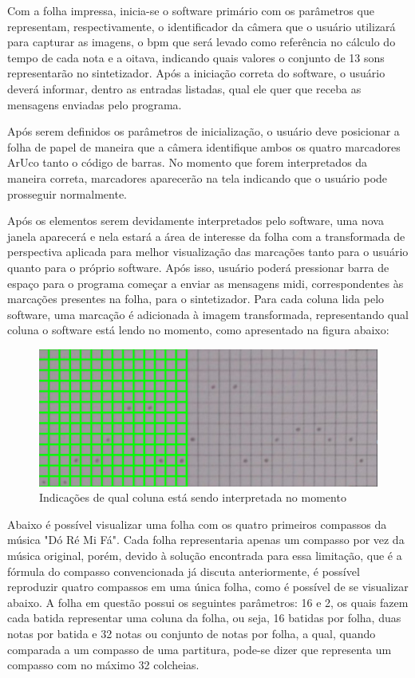 \documentclass[12pt]{report}
\begin{document}
Com a folha impressa, inicia-se o software primário com os parâmetros
que representam, respectivamente, o identificador da câmera que o
usuário utilizará para capturar as imagens, o bpm que será levado como
referência no cálculo do tempo de cada nota e a oitava, indicando
quais valores o conjunto de 13 sons representarão no
sintetizador. Após a iniciação correta do software, o usuário deverá
informar, dentro as entradas listadas, qual ele quer que receba as
mensagens enviadas pelo programa.

Após serem definidos os parâmetros de inicialização, o usuário deve
posicionar a folha de papel de maneira que a câmera identifique ambos
os quatro marcadores ArUco tanto o código de barras. No momento que
forem interpretados da maneira correta, marcadores aparecerão na tela
indicando que o usuário pode prosseguir normalmente.


Após os elementos serem devidamente interpretados pelo software, uma
nova janela aparecerá e nela estará a área de interesse da folha com a
transformada de perspectiva aplicada para melhor visualização das
marcações tanto para o usuário quanto para o próprio software. Após
isso, usuário poderá pressionar barra de espaço para o programa
começar a enviar as mensagens midi, correspondentes às marcações
presentes na folha, para o sintetizador. Para cada coluna lida pelo
software, uma marcação é adicionada à imagem transformada,
representando qual coluna o software está lendo no momento, como
apresentado na figura abaixo:

\begin{figure}[H]
  \centering
  \includegraphics[width=1\textwidth]{imagens/area_transformada_preenchida.png}
  \caption{Indicações de qual coluna está sendo interpretada no momento}
  \label{fig:colunas_marcacoes}
\end{figure}

Abaixo é possível visualizar uma folha com os quatro primeiros
compassos da música "Dó Ré Mi Fá". Cada folha representaria apenas um
compasso por vez da música original, porém, devido à solução
encontrada para essa limitação, que é a fórmula do compasso
convencionada já discuta anteriormente, é possível reproduzir quatro
compassos em uma única folha, como é possível de se visualizar
abaixo. A folha em questão possui os seguintes parâmetros: 16 e 2, os
quais fazem cada batida representar uma coluna da folha, ou seja, 16
batidas por folha, duas notas por batida e 32 notas ou conjunto de
notas por folha, a qual, quando comparada a um compasso de uma
partitura, pode-se dizer que representa um compasso com no máximo 32
colcheias.
\end{document}
